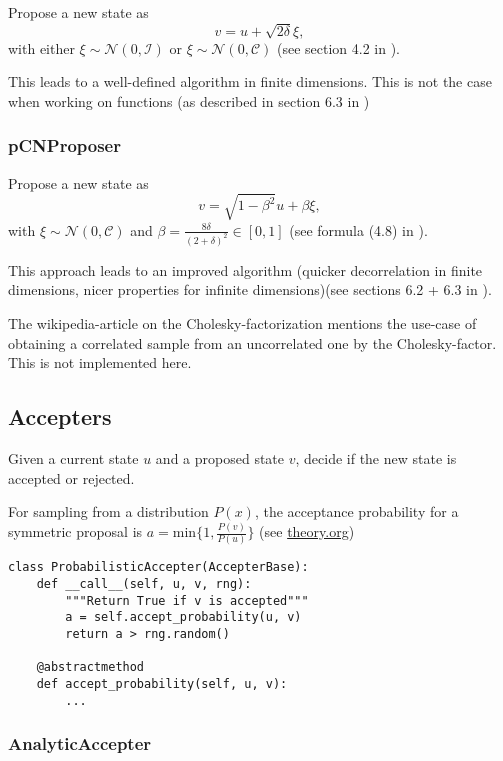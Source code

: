 \documentclass[11pt]{article}
\newcommand{\C}{{\mathcal{C}}}
\newcommand{\I}{{\mathcal{I}}}
\newcommand{\N}[2]{\mathcal{N}\left(#1,#2\right)}
\begin{document}
Propose a new state as
$$v = u + \sqrt{2\delta} \xi,$$
with either \(\xi \sim \N{0}{\I}\) or \(\xi \sim \N{0}{\C}\) (see section 4.2 in \cite{cotter_mcmc_2013}).

This leads to a well-defined algorithm in finite dimensions.
This is not the case when working on functions (as described in section 6.3 in \cite{cotter_mcmc_2013})

\subsubsection{pCNProposer}
\label{sec:org1253113}

Propose a new state as
$$v = \sqrt{1-\beta^2} u + \beta \xi,$$
with \(\xi \sim \N{0}{\C}\) and \(\beta = \frac{8\delta}{(2+\delta)^2} \in [0,1]\)
(see formula (4.8) in \cite{cotter_mcmc_2013}).

This approach leads to an improved algorithm (quicker decorrelation in finite dimensions,
nicer properties for infinite dimensions)(see sections 6.2 + 6.3 in \cite{cotter_mcmc_2013}).

The wikipedia-article on the Cholesky-factorization mentions the use-case of obtaining a
correlated sample from an uncorrelated one by the Cholesky-factor. This is not implemented here.
\subsection{Accepters}
\label{sec:orgd229901}

Given a current state \(u\) and a proposed state \(v\), decide if the new state is accepted or rejected.

For sampling from a distribution \(P(x)\), the acceptance probability for a symmetric proposal is
\(a = \text{min}\{1, \frac{P(v)}{P(u)}\}\)
(see \url{theory.org})

\begin{verbatim}
class ProbabilisticAccepter(AccepterBase):
    def __call__(self, u, v, rng):
        """Return True if v is accepted"""
        a = self.accept_probability(u, v)
        return a > rng.random()

    @abstractmethod
    def accept_probability(self, u, v):
        ...
\end{verbatim}

\subsubsection{AnalyticAccepter}
\label{sec:org05d74ce}
\end{document}

